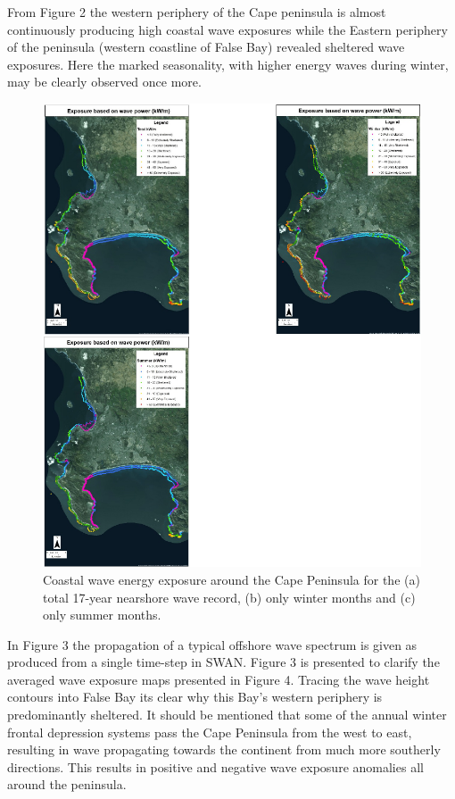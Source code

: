 \documentclass[10pt,a4,]{article}
\makeatletter
\def\maxwidth{\ifdim\Gin@nat@width>\linewidth\linewidth
\else\Gin@nat@width\fi}
\let\Oldincludegraphics\includegraphics
\renewcommand{\includegraphics}[1]{\Oldincludegraphics[width=\maxwidth]{#1}}
\makeatother
\begin{document}
From Figure 2 the western periphery of the Cape peninsula is almost
continuously producing high coastal wave exposures while the Eastern
periphery of the peninsula (western coastline of False Bay) revealed
sheltered wave exposures. Here the marked seasonality, with higher
energy waves during winter, may be clearly observed once more.

\begin{figure}
\centering
\includegraphics{chapter_2_files/figure-latex/unnamed-chunk-3-1.pdf}
\caption{Coastal wave energy exposure around the Cape Peninsula for the
(a) total 17-year nearshore wave record, (b) only winter months and (c)
only summer months.}
\end{figure}

In Figure 3 the propagation of a typical offshore wave spectrum is given
as produced from a single time-step in SWAN. Figure 3 is presented to
clarify the averaged wave exposure maps presented in Figure 4. Tracing
the wave height contours into False Bay its clear why this Bay's western
periphery is predominantly sheltered. It should be mentioned that some
of the annual winter frontal depression systems pass the Cape Peninsula
from the west to east, resulting in wave propagating towards the
continent from much more southerly directions. This results in positive
and negative wave exposure anomalies all around the peninsula.
\end{document}
